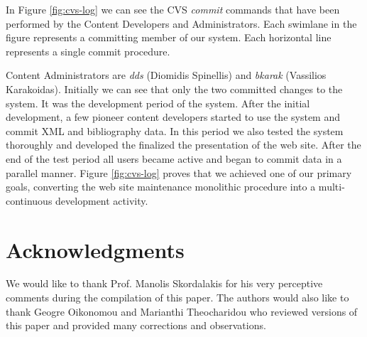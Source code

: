 \documentclass[10pt]{article}
\begin{document}
In Figure \ref{fig:cvs-log} we can see the {\sc CVS} \textit{commit} commands that have been performed by
the Content Developers and Administrators. Each swimlane in the figure represents a committing
member of our system. Each horizontal line represents a single commit procedure.

Content Administrators are \textit{dds} (Diomidis Spinellis) and \textit{bkarak} (Vassilios Karakoidas). 
Initially we can see that only the two committed 
changes to the system. It was the development period of the system. After the initial development, a few 
pioneer content developers started to use the system and commit {\sc XML} and bibliography data. In this period 
we also tested the system thoroughly and developed the finalized the presentation of the web site. After the end of
the test period all users became active and began to commit data in a parallel manner. Figure \ref{fig:cvs-log} proves that we achieved 
one of our primary goals, converting the web site maintenance monolithic procedure into a multi-continuous development activity.

\section{Acknowledgments}
\label{sec:ack}

We would like to thank Prof. Manolis Skordalakis for his very perceptive comments during the compilation of this paper.
The authors would also like to thank Geogre Oikonomou and Marianthi Theocharidou who reviewed versions 
of this paper and provided many corrections and observations.



\end{document}
